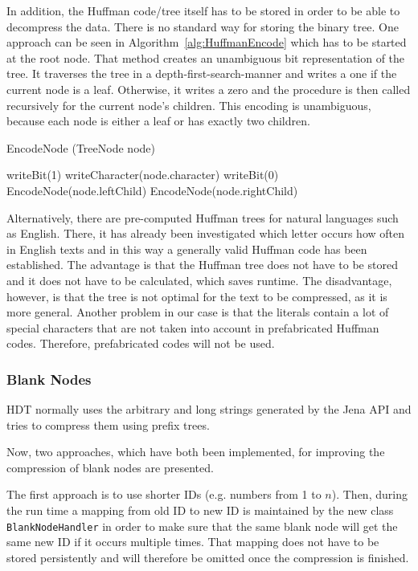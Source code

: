 In addition, the Huffman code/tree itself has to be stored in order to be able to decompress the data. There is no standard way for storing the binary tree. One approach can be seen in Algorithm~\ref{alg:HuffmanEncode} which has to be started at the root node. That method creates an unambiguous bit representation of the tree. It traverses the tree in a depth-first-search-manner and writes a one if the current node is a leaf. Otherwise, it writes a zero and the procedure is then called recursively for the current node's children. This encoding is unambiguous, because each node is either a leaf or has exactly two children.

\begin{algorithm}
	\caption{EncodeNode (TreeNode node)}\label{alg:HuffmanEncode}
	\begin{algorithmic}[1]
		\State writeBit(1)
		\State writeCharacter(node.character)
		\Else
		\State writeBit(0)
		\State EncodeNode(node.leftChild)
		\State EncodeNode(node.rightChild)
		\EndIf
	\end{algorithmic}
\end{algorithm}


Alternatively, there are pre-computed Huffman trees for natural languages such as English. There, it has already been investigated which letter occurs how often in English texts and in this way a generally valid Huffman code has been established. The advantage is that the Huffman tree does not have to be stored and it does not have to  be calculated, which saves runtime. The disadvantage, however, is that the tree is not optimal for the text to be compressed, as it is more general. Another problem in our case is that the literals contain a lot of special characters that are not taken into account in prefabricated Huffman codes. Therefore, prefabricated codes will not be used.

\subsubsection{Blank Nodes}\label{sec:implementationBlankNodes}

HDT normally uses the arbitrary and long strings generated by the Jena API and tries to compress them using prefix trees.

Now, two approaches, which have both been implemented, for improving the compression of blank nodes are presented.

The first approach is to use shorter IDs (e.g. numbers from 1 to $n$). Then, during the run time a mapping from old ID to new ID is maintained by the new class {\tt BlankNodeHandler} in order to make sure that the same blank node will get the same new ID if it occurs multiple times. That mapping does not have to be stored persistently and will therefore be omitted once the compression is finished.

